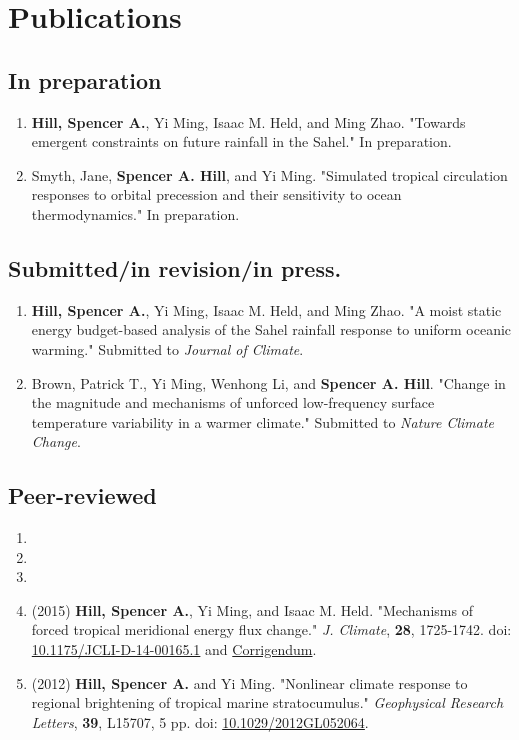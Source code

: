\documentclass{article}
\begin{document}
\section*{Publications}
\label{sec:org2962c9b}
\nobibliography*
\subsection*{In preparation}
\label{sec:orga869211}
\begin{enumerate}
\item \textbf{Hill, Spencer A.}, Yi Ming, Isaac M. Held, and Ming Zhao.  "Towards emergent
constraints on future rainfall in the Sahel."  In preparation.
\item Smyth, Jane, \textbf{Spencer A. Hill}, and Yi Ming.  "Simulated tropical circulation
responses to orbital precession and their sensitivity to ocean
thermodynamics."  In preparation.
\end{enumerate}
\subsection*{Submitted/in revision/in press.}
\label{sec:orge70ef5d}
\begin{enumerate}
\item \textbf{Hill, Spencer A.}, Yi Ming, Isaac M. Held, and Ming Zhao.  "A moist static
energy budget-based analysis of the Sahel rainfall response to uniform
oceanic warming."  Submitted to \emph{Journal of
Climate}.
\item Brown, Patrick T., Yi Ming, Wenhong Li, and \textbf{Spencer A. Hill}.  "Change in the
magnitude and mechanisms of unforced low-frequency surface temperature
variability in a warmer climate."  Submitted to \emph{Nature Climate Change}.
\end{enumerate}
\subsection*{Peer-reviewed}
\label{sec:org1309b2b}
\begin{enumerate}
\item {}
\item {}
\item {}
\item (2015) \textbf{Hill, Spencer A.}, Yi Ming, and Isaac M. Held. "Mechanisms of forced tropical
meridional energy flux change."  \emph{J. Climate}, \textbf{28}, 1725-1742.  doi:
\href{http://dx.doi.org/10.1175/JCLI-D-14-00165.1}{10.1175/JCLI-D-14-00165.1} and \href{http://journals.ametsoc.org/doi/abs/10.1175/JCLI-D-16-0485.1}{Corrigendum}.
\item (2012) \textbf{Hill, Spencer A.} and Yi Ming. "Nonlinear climate response to regional
brightening of tropical marine stratocumulus."  \emph{Geophysical Research Letters},
\textbf{39}, L15707, 5 pp. doi: \href{http://dx.doi.org/10.1029/2012GL052064}{10.1029/2012GL052064}.
\end{enumerate}
\end{document}
